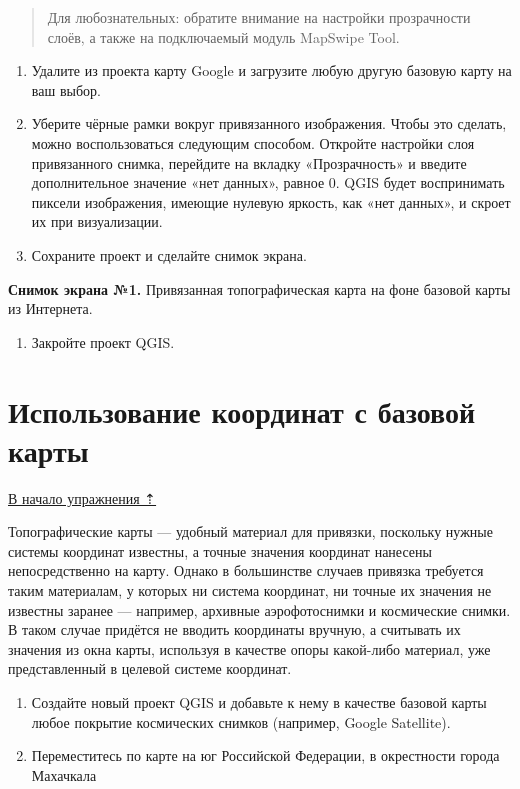 \documentclass[
  12pt,
]{book}
\providecommand{\tightlist}{%
  \setlength{\itemsep}{0pt}\setlength{\parskip}{0pt}}
\begin{document}
\begin{quote}
Для любознательных: обратите внимание на настройки прозрачности слоёв, а также на подключаемый модуль MapSwipe Tool.
\end{quote}

\begin{enumerate}
\def\labelenumi{\arabic{enumi}.}
\setcounter{enumi}{6}
\item
  Удалите из проекта карту Google и загрузите любую другую базовую карту на ваш выбор.
\item
  Уберите чёрные рамки вокруг привязанного изображения. Чтобы это сделать, можно воспользоваться следующим способом. Откройте настройки слоя привязанного снимка, перейдите на вкладку «Прозрачность» и введите дополнительное значение «нет данных», равное 0. QGIS будет воспринимать пиксели изображения, имеющие нулевую яркость, как «нет данных», и скроет их при визуализации.
\item
  Сохраните проект и сделайте снимок экрана.
\end{enumerate}

\textbf{Снимок экрана №1.} Привязанная топографическая карта на фоне базовой карты из Интернета.

\begin{enumerate}
\def\labelenumi{\arabic{enumi}.}
\setcounter{enumi}{9}
\tightlist
\item
  Закройте проект QGIS.
\end{enumerate}

\hypertarget{raster-reference-frommap}{%
\section{Использование координат с базовой карты}\label{raster-reference-frommap}}

\protect\hyperlink{raster-reference}{В начало упражнения ⇡}

Топографические карты --- удобный материал для привязки, поскольку нужные системы координат известны, а точные значения координат нанесены непосредственно на карту. Однако в большинстве случаев привязка требуется таким материалам, у которых ни система координат, ни точные их значения не известны заранее --- например, архивные аэрофотоснимки и космические снимки. В таком случае придётся не вводить координаты вручную, а считывать их значения из окна карты, используя в качестве опоры какой-либо материал, уже представленный в целевой системе координат.

\begin{enumerate}
\def\labelenumi{\arabic{enumi}.}
\item
  Создайте новый проект QGIS и добавьте к нему в качестве базовой карты любое покрытие космических снимков (например, Google Satellite).
\item
  Переместитесь по карте на юг Российской Федерации, в окрестности города Махачкала
\end{enumerate}
\end{document}

